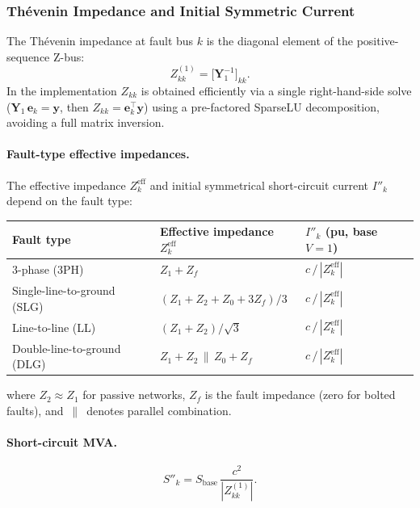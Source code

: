 \subsubsection{Thévenin Impedance and Initial Symmetric Current}

The Thévenin impedance at fault bus $k$ is the diagonal element of the
positive-sequence Z-bus:
\begin{equation}
  Z_{kk}^{(1)} = \bigl[\mathbf{Y}_1^{-1}\bigr]_{kk}.
  \label{eq:sc-Zkk}
\end{equation}
In the implementation $Z_{kk}$ is obtained efficiently via a single
right-hand-side solve ($\mathbf{Y}_1\,\mathbf{e}_k = \mathbf{y}$, then
$Z_{kk} = \mathbf{e}_k^\top\mathbf{y}$) using a pre-factored SparseLU
decomposition, avoiding a full matrix inversion.

\paragraph{Fault-type effective impedances.}
The effective impedance $Z_k^{\text{eff}}$ and initial symmetrical
short-circuit current $I''_k$ depend on the fault type:

\begin{center}
\renewcommand{\arraystretch}{1.4}
\begin{tabular}{lll}
\hline\hline
\textbf{Fault type} & \textbf{Effective impedance $Z_k^{\text{eff}}$}
  & \textbf{$I''_k$ (pu, base $V = 1$)} \\
\hline
3-phase (3PH)
  & $Z_1 + Z_f$
  & $c\,/\,|Z_k^{\text{eff}}|$ \\
Single-line-to-ground (SLG)
  & $(Z_1 + Z_2 + Z_0 + 3Z_f)/3$
  & $c\,/\,|Z_k^{\text{eff}}|$ \\
Line-to-line (LL)
  & $(Z_1 + Z_2)/\sqrt{3}$
  & $c\,/\,|Z_k^{\text{eff}}|$ \\
Double-line-to-ground (DLG)
  & $Z_1 + Z_2 \,\|\, Z_0 + Z_f$
  & $c\,/\,|Z_k^{\text{eff}}|$ \\
\hline\hline
\end{tabular}
\renewcommand{\arraystretch}{1.0}
\end{center}
where $Z_2 \approx Z_1$ for passive networks, $Z_f$ is the fault
impedance (zero for bolted faults), and $\,\|\,$ denotes parallel
combination.

\paragraph{Short-circuit MVA.}
\begin{equation}
  S''_k = S_{\text{base}}\,\frac{c^2}{\left|Z_{kk}^{(1)}\right|}.
  \label{eq:sc-Sk}
\end{equation}

